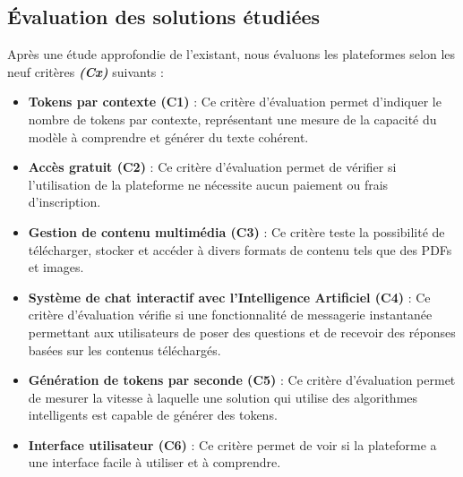 \subsection{Évaluation des solutions étudiées}
Après une étude approfondie de l’existant, nous évaluons les plateformes selon les neuf critères \textbf{\textit{(Cx)}} suivants :
\begin{itemize}[itemsep=2pt, parsep=2pt]
    \item \textbf{Tokens par contexte (C1)} : Ce critère d’évaluation permet d’indiquer le nombre de tokens par contexte, représentant une mesure de la capacité du modèle à comprendre et générer du texte cohérent.
    \item \textbf{Accès gratuit (C2)} : Ce critère d’évaluation permet de vérifier si l'utilisation de la plateforme ne nécessite aucun paiement ou frais d'inscription.
    \item \textbf{Gestion de contenu multimédia (C3)} : Ce critère teste la possibilité de télécharger, stocker et accéder à divers formats de contenu tels que des PDFs et images.
    \item \textbf{Système de chat interactif avec l’Intelligence Artificiel (C4)} : Ce critère d’évaluation vérifie si une fonctionnalité de messagerie instantanée permettant aux utilisateurs de poser des questions et de recevoir des réponses basées sur les contenus téléchargés.
    \item \textbf{Génération de tokens par seconde (C5)} : Ce critère d'évaluation permet de mesurer la vitesse à laquelle une solution qui utilise des algorithmes intelligents est capable de générer des tokens.
    \item \textbf{Interface utilisateur (C6)} : Ce critère permet de voir si la plateforme a une interface facile à utiliser et à comprendre.
\end{itemize}

